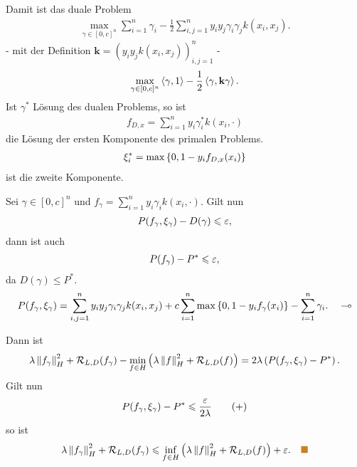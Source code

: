 \begin{bsp*}
Damit ist das duale Problem
\begin{align*}
\max_{\gamma\in[0,c]^n} \sum_{i=1}^n \gamma_i - \frac{1}{2}
\sum_{i,j=1}^n y_iy_j \gamma_i\gamma_j k(x_i,x_j).\tag{*}
\end{align*}
- mit der Definition $\mathbf{k} = (y_iy_j k(x_i,x_j))_{i,j=1}^n$ -
\begin{align*}
\max_{\gamma\in[0,c]^n} \left\langle\gamma,1\right\rangle -
\frac{1}{2}\left\langle\gamma,\mathbf{k}\gamma\right\rangle.
\end{align*}
Ist $\gamma^*$ Lösung des dualen Problems, so ist
\begin{align*}
f_{D,x} = \sum_{i=1}^n y_i \gamma_i^* k(x_i,\cdot)
\end{align*}
die Lösung der ersten Komponente des primalen Problems.
\begin{align*}
\xi_i^* = \max\left\{ 0,1-y_i f_{D,x}(x_i) \right\}
\end{align*} 
ist die zweite Komponente.

\begin{bem*}
Sei $\gamma\in[0,c]^n$ und $f_\gamma = \sum_{i=1}^n y_i \gamma_i k(x_i,\cdot)$.
Gilt nun 
\begin{align*}
P(f_\gamma,\xi_\gamma) - D(\gamma) \leqslant \varepsilon,
\end{align*}
dann ist auch
\begin{align*}
P(f_\gamma) - P^* \leqslant \varepsilon,
\end{align*}
da $D(\gamma)\le P^*$.
\begin{align*}
P(f_\gamma,\xi_\gamma) = \sum_{i,j=1}^n y_iy_j \gamma_i\gamma_j k(x_i,x_j) +
c\sum_{i=1}^n \max\left\{ 0,1-y_if_\gamma(x_i) \right\} - \sum_{i=1}^n \gamma_i.\quad\multimap
\end{align*}
\end{bem*}
Dann ist
\begin{align*}
\lambda\left\|f_\gamma\right\|^2_H + \mathcal{R}_{L,D}(f_\gamma) - \min_{f\in
H}\left(\lambda\left\|f\right\|_H^2 + \mathcal{R}_{L,D}(f) \right)
= 2\lambda\left(P(f_\gamma,\xi_\gamma) - P^* \right).
\end{align*}
Gilt nun
\begin{align*}
P(f_\gamma,\xi_\gamma) - P^* \leqslant \frac{\varepsilon}{2\lambda}\tag{+}
\end{align*}
so ist
\begin{align*}
\lambda\norm{f_\gamma}^2_H + \RR_{L,D}(f_\gamma) 
\le \inf_{f\in
H}\left(\lambda\norm{f}_H^2 + \RR_{L,D}(f) \right)
+\ep.\bsphere
\end{align*}
\end{bsp*}


